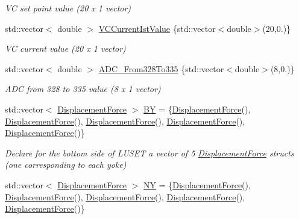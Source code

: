 \begin{DoxyCompactItemize}
\begin{DoxyCompactList}\small\item\em VC set point value (20 x 1 vector) \end{DoxyCompactList}\item 
std\+::vector$<$ double $>$ \hyperlink{classlusetstatenamespace_1_1LusetState_afc512c3c96a1c7adb8b6d185d308fce7}{V\+C\+Current\+Ist\+Value} \{std\+::vector$<$double$>$(20,0.)\}
\begin{DoxyCompactList}\small\item\em VC current value (20 x 1 vector) \end{DoxyCompactList}\item 
std\+::vector$<$ double $>$ \hyperlink{classlusetstatenamespace_1_1LusetState_a18efadf7bae2bb68d539952cd05dec45}{A\+D\+C\+\_\+\+From328\+To335} \{std\+::vector$<$double$>$(8,0.)\}
\begin{DoxyCompactList}\small\item\em A\+DC from 328 to 335 value (8 x 1 vector) \end{DoxyCompactList}\item 
std\+::vector$<$ \hyperlink{structlusetstatenamespace_1_1LusetState_1_1DisplacementForce}{Displacement\+Force} $>$ \hyperlink{classlusetstatenamespace_1_1LusetState_abeb4a528a04de04fb13a5012d23fb9fd}{BY} = \{\hyperlink{structlusetstatenamespace_1_1LusetState_1_1DisplacementForce}{Displacement\+Force}(), \hyperlink{structlusetstatenamespace_1_1LusetState_1_1DisplacementForce}{Displacement\+Force}(), \hyperlink{structlusetstatenamespace_1_1LusetState_1_1DisplacementForce}{Displacement\+Force}(), \hyperlink{structlusetstatenamespace_1_1LusetState_1_1DisplacementForce}{Displacement\+Force}(), \hyperlink{structlusetstatenamespace_1_1LusetState_1_1DisplacementForce}{Displacement\+Force}()\}
\begin{DoxyCompactList}\small\item\em Declare for the bottom side of L\+U\+S\+ET a vector of 5 \hyperlink{structlusetstatenamespace_1_1LusetState_1_1DisplacementForce}{Displacement\+Force} structs (one corresponding to each yoke) \end{DoxyCompactList}\item 
std\+::vector$<$ \hyperlink{structlusetstatenamespace_1_1LusetState_1_1DisplacementForce}{Displacement\+Force} $>$ \hyperlink{classlusetstatenamespace_1_1LusetState_a457bc98481c1c2e653dc63df35586836}{NY} = \{\hyperlink{structlusetstatenamespace_1_1LusetState_1_1DisplacementForce}{Displacement\+Force}(), \hyperlink{structlusetstatenamespace_1_1LusetState_1_1DisplacementForce}{Displacement\+Force}(), \hyperlink{structlusetstatenamespace_1_1LusetState_1_1DisplacementForce}{Displacement\+Force}(), \hyperlink{structlusetstatenamespace_1_1LusetState_1_1DisplacementForce}{Displacement\+Force}(), \hyperlink{structlusetstatenamespace_1_1LusetState_1_1DisplacementForce}{Displacement\+Force}()\}

\end{DoxyCompactItemize}

